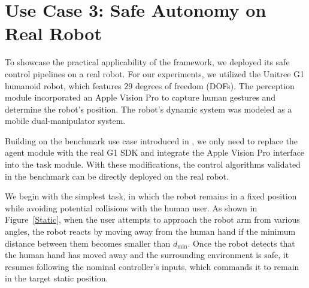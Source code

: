 \section{Use Case 3: Safe Autonomy on Real Robot}\label{sec: usecase_safe_auto_real}








To showcase the practical applicability of the \spark framework, we deployed its safe control pipelines on a real robot.
For our experiments, we utilized the Unitree G1 humanoid robot, which features 29 degrees of freedom (DOFs).
The perception module incorporated an Apple Vision Pro to capture human gestures and determine the robot’s position.
The robot’s dynamic system was modeled as a mobile dual-manipulator system.

Building on the benchmark use case introduced in , we only need to replace the agent module with the real G1 SDK and integrate the Apple Vision Pro interface into the task module.
With these modifications, the control algorithms validated in the benchmark can be directly deployed on the real robot.


We begin with the simplest task, in which the robot remains in a fixed position while avoiding potential collisions with the human user. 
As shown in Figure~\ref{Static}, when the user attempts to approach the robot arm from various angles, the robot reacts by moving away from the human hand if the minimum distance between them becomes smaller than $d_\mathrm{min}$. Once the robot detects that the human hand has moved away and the surrounding environment is safe, it resumes following the nominal controller's inputs, which commands it to remain in the target static position.

